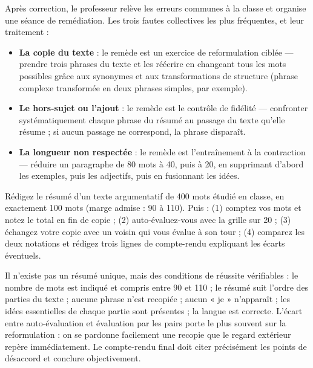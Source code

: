 \documentclass[11pt]{article}
\newcommand{\cle}[1]{{\popxbold\color{popdark}#1}}
\begin{document}
Après correction, le professeur relève les erreurs communes à la classe et organise une séance de \cle{remédiation}. Les trois fautes collectives les plus fréquentes, et leur traitement :

\begin{itemize}
\item \textbf{La copie du texte} : le remède est un exercice de reformulation ciblée — prendre trois phrases du texte et les réécrire en changeant tous les mots possibles grâce aux synonymes et aux transformations de structure (phrase complexe transformée en deux phrases simples, par exemple).
\item \textbf{Le hors-sujet ou l'ajout} : le remède est le contrôle de fidélité — confronter systématiquement chaque phrase du résumé au passage du texte qu'elle résume ; si aucun passage ne correspond, la phrase disparaît.
\item \textbf{La longueur non respectée} : le remède est l'entraînement à la contraction — réduire un paragraphe de 80 mots à 40, puis à 20, en supprimant d'abord les exemples, puis les adjectifs, puis en fusionnant les idées.
\end{itemize}

\begin{exercice}
Rédigez le résumé d'un texte argumentatif de 400 mots étudié en classe, en exactement 100 mots (marge admise : 90 à 110). Puis : (1) comptez vos mots et notez le total en fin de copie ; (2) auto-évaluez-vous avec la grille sur 20 ; (3) échangez votre copie avec un voisin qui vous évalue à son tour ; (4) comparez les deux notations et rédigez trois lignes de compte-rendu expliquant les écarts éventuels.
\end{exercice}

\begin{corrige}
Il n'existe pas un résumé unique, mais des conditions de réussite vérifiables : le nombre de mots est indiqué et compris entre 90 et 110 ; le résumé suit l'ordre des parties du texte ; aucune phrase n'est recopiée ; aucun « je » n'apparaît ; les idées essentielles de chaque partie sont présentes ; la langue est correcte. L'écart entre auto-évaluation et évaluation par les pairs porte le plus souvent sur la reformulation : on se pardonne facilement une recopie que le regard extérieur repère immédiatement. Le compte-rendu final doit citer précisément les points de désaccord et conclure objectivement.
\end{corrige}
\end{document}
